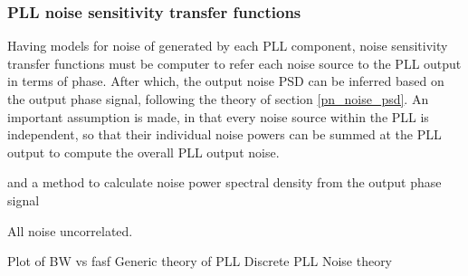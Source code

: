 \subsubsection{PLL noise sensitivity transfer functions}
Having models for noise of generated by each PLL component, noise sensitivity transfer functions must be computer to refer each noise source to the PLL output in terms of phase. After which, the output noise PSD can be inferred based on the output phase signal, following the theory of section \ref{pn_noise_psd}. An important assumption is made, in that every noise source within the PLL is independent, so that their individual noise powers can be summed at the PLL output to compute the overall PLL output noise.

 and a method to calculate noise power spectral density from the output phase signal


All noise uncorrelated.

Plot of BW vs 
fasf
Generic theory of PLL
Discrete PLL
Noise theory
